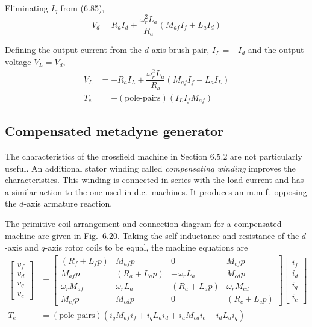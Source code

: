 \documentclass[a4paper,numbers=noenddot,12pt]{scrbook}
\begin{document}
Eliminating $I_q$ from (6.85),
\begin{equation}
    V_d = R_a I_d + \dfrac{\omega_r^2 L_a}{R_a}(M_{af} I_f + L_a I_d)
    \label{eq:Eq6.87}
\end{equation}

Defining the output current from the $d$-axis brush-pair, $I_L = -I_d$ and the output voltage $V_L = V_d$,
\begin{align}
    V_L & = -R_a I_L + \dfrac{\omega_r^2 L_a}{R_a}(M_{af} I_f - L_a I_L) \\
    T_e & = -(\text{pole-pairs})(I_L I_f M_{af})
    \label{eq:Eq6.89}
\end{align}

\subsection{Compensated metadyne generator}
The characteristics of the crossfield machine in Section 6.5.2 are not particularly useful. An additional stator winding called \textit{compensating winding} improves the characteristics. This winding is connected in series with the load current and has a similar action to the one used in d.c.\ machines. It produces an m.m.f.\ opposing the $d$-axis armature reaction.

The primitive coil arrangement and connection diagram for a compensated machine are given in Fig.\ 6.20. Taking the self-inductance and resistance of the $d$-axis and $q$-axis rotor coils to be equal, the machine equations are
\begin{align}
    \begin{bmatrix}
        v_f \\ v_d \\ v_q \\ v_c
    \end{bmatrix}
    & = 
    \begin{bmatrix}
        (R_f + L_f p) & M_{af} p & 0 & M_{cf} p \\
        M_{af} p & (R_a + L_a p) & -\omega_r L_a & M_{cd} p \\
        \omega_r M_{af} & \omega_r L_a & (R_a + L_a p) & \omega_r M_{cd} \\
        M_{cf} p & M_{cd} p & 0 & (R_c + L_c p)
    \end{bmatrix}
    \begin{bmatrix}
        i_f \\ i_d \\ i_q \\ i_c
    \end{bmatrix} \\
    T_e & = (\text{pole-pairs})(i_q M_{af} i_f + i_q L_a i_d + i_a M_{cd} i_c - i_d L_a i_q)
    \label{eq:Eq6.91}
\end{align}
\end{document}
